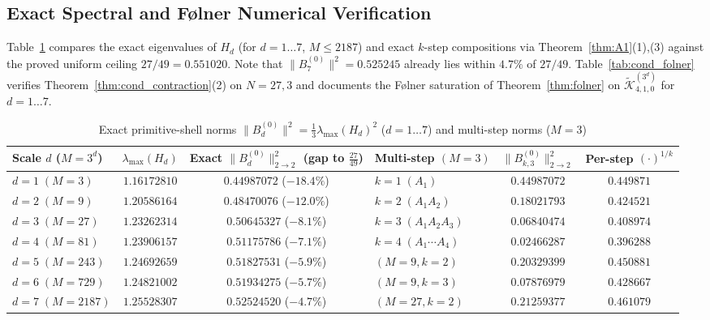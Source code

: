 \documentclass[11pt,a4paper]{article}
\numberwithin{equation}{section}
\theoremstyle{definition}
\theoremstyle{remark}
\newcommand{\cK}{\mathcal{K}}
\begin{document}
\subsection{Exact Spectral and F{\o}lner Numerical Verification}\label{subsec:tables_1_2}

Table~\ref{tab:A1_spec} compares the exact eigenvalues of $H_d$ (for $d = 1 \dots 7$, $M \le 2187$) and exact $k$-step compositions via Theorem~\ref{thm:A1}(1),(3) against the proved uniform ceiling $27/49 = 0.551020$. Note that $\|B_7^{(0)}\|^2 = 0.525245$ already lies within $4.7\%$ of $27/49$. Table~\ref{tab:cond_folner} verifies Theorem~\ref{thm:cond_contraction}(2) on $N = 27, 3$ and documents the F{\o}lner saturation of Theorem~\ref{thm:folner} on $\widetilde{\cK}_{4, 1, 0}^{(3^d)}$ for $d = 1 \dots 7$.

\begin{table}[htbp]
\centering
\caption{Exact primitive-shell norms $\|B_d^{(0)}\|^2 = \frac{1}{3}\lambda_{\max}(H_d)^2$ ($d=1\dots 7$) and multi-step norms ($M=3$)}
\label{tab:A1_spec}
\small
\setlength{\tabcolsep}{5pt}
\begin{tabular}{@{}lcc|lcc@{}}
\toprule
Scale $d$ ($M = 3^d$) & $\lambda_{\max}(H_d)$ & \shortstack{Exact $\|B_d^{(0)}\|_{2\to 2}^2$\\(gap to $\frac{27}{49}$)} & \shortstack{Multi-step\\$(M=3)$} & $\|B_{k, 3}^{(0)}\|_{2\to 2}^2$ & Per-step $(\cdot)^{1/k}$ \\
\midrule
$d=1\;(M=3)$ & $1.16172810$ & $0.44987072$ ($-18.4\%$) & $k=1\;(A_1)$ & $0.44987072$ & $0.449871$ \\
$d=2\;(M=9)$ & $1.20586164$ & $0.48470076$ ($-12.0\%$) & $k=2\;(A_1 A_2)$ & $0.18021793$ & $0.424521$ \\
$d=3\;(M=27)$ & $1.23262314$ & $0.50645327$ ($-8.1\%$) & $k=3\;(A_1 A_2 A_3)$ & $0.06840474$ & $0.408974$ \\
$d=4\;(M=81)$ & $1.23906157$ & $0.51175786$ ($-7.1\%$) & $k=4\;(A_1\cdots A_4)$ & $0.02466287$ & $0.396288$ \\
$d=5\;(M=243)$ & $1.24692659$ & $0.51827531$ ($-5.9\%$) & $(M=9, k=2)$ & $0.20329399$ & $0.450881$ \\
$d=6\;(M=729)$ & $1.24821002$ & $0.51934275$ ($-5.7\%$) & $(M=9, k=3)$ & $0.07876979$ & $0.428667$ \\
$d=7\;(M=2187)$ & $1.25528307$ & $0.52524520$ ($-4.7\%$) & $(M=27, k=2)$ & $0.21259377$ & $0.461079$ \\
\bottomrule
\end{tabular}
\end{table}
\end{document}
